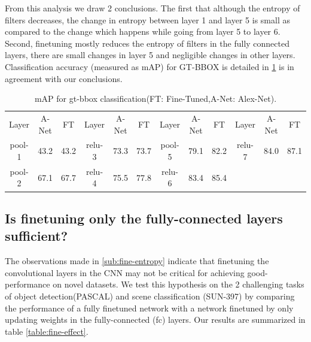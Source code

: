 \documentclass[runningheads]{llncs}
\begin{document}
From this analysis we draw 2 conclusions. The first that although the entropy of filters decreases, the change in entropy between layer 1 and layer 5 is small as compared to the change which happens while going from layer 5 to layer 6. Second, finetuning mostly reduces the entropy of filters in the fully connected layers, there are small changes in layer 5 and negligible changes in other layers. Classification accuracy (measured as mAP) for GT-BBOX is detailed in \ref{table:gt-bbox-fine} is in agreement with our conclusions.

\setlength{\tabcolsep}{4pt}
\begin{table}
\begin{center}
\caption{mAP for gt-bbox classification(FT: Fine-Tuned,A-Net: Alex-Net).}
\label{table:gt-bbox-fine}
\begin{tabular}{ccc|ccc|ccc|ccc}
\hline\noalign{\smallskip}
Layer & A-Net & FT & Layer & A-Net & FT & Layer & A-Net & FT & Layer & A-Net & FT \\
\noalign{\smallskip}
\hline
\noalign{\smallskip}
pool-1 & 43.2 & 43.2  & relu-3 & 73.3 & 73.7 & pool-5 & 79.1 & 82.2 & relu-7 & 84.0 & 87.1 \\
pool-2  & 67.1 & 67.7 & relu-4 & 75.5 & 77.8 & relu-6 & 83.4 & 85.4 \\
\hline
\end{tabular}
\end{center}
\end{table}
\setlength{\tabcolsep}{1.4pt}

\subsection{Is finetuning only the fully-connected layers sufficient?}
\label{sub:fine-fc-only}
The observations made in \ref{sub:fine-entropy} indicate that finetuning the convolutional layers in the CNN may not be critical for achieving good-performance on novel datasets. We test this hypothesis on the 2 challenging tasks of object detection(PASCAL) and scene classification (SUN-397) by comparing the performance of a fully finetuned network with a network finetuned by only updating weights in the fully-connected (fc) layers. Our results are summarized in table \ref{table:fine-effect}.
\end{document}
